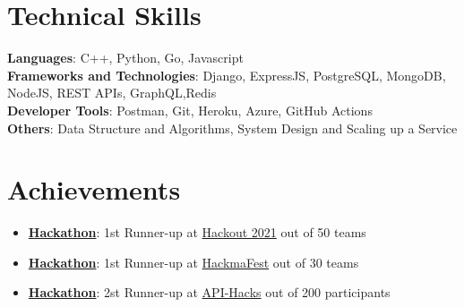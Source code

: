 \documentclass[letterpaper,11pt]{article}
\newcommand{\resumeItem}[1]{
  \item\small{
    {#1 \vspace{-2pt}}
  }
}
\newcommand{\resumeItemListStart}{\begin{itemize}}
\newcommand{\resumeItemListEnd}{\end{itemize}\vspace{-5pt}}
\begin{document}
%
\section{Technical Skills}
 \begin{itemize}[leftmargin=0.15in, label={}]
    \small{\item{
     \textbf{Languages}{: C++, Python, Go, Javascript} \\
     \textbf{Frameworks and Technologies}{: Django, ExpressJS, PostgreSQL, MongoDB, NodeJS, REST APIs, GraphQL,Redis} \\
     \textbf{Developer Tools}{: Postman, Git, Heroku, Azure, GitHub Actions} \\
     \textbf{Others}{: Data Structure and Algorithms, System Design and Scaling up a Service}\\
    }}
 \end{itemize}

\section{Achievements}
 \begin{itemize}[leftmargin=0.15in, label={}]
    \small{\item{
        \resumeItemListStart
                \resumeItem{\textbf{\href{Link if any}{Hackathon}}: 1st Runner-up at \href{https://www.hackout.io/}{Hackout 2021} out of 50 teams}
                \resumeItem{\textbf{\href{Link if any}{Hackathon}}: 1st Runner-up at \href{https://hackmafest.tech/}{HackmaFest} out of 30 teams}
                \resumeItem{\textbf{\href{Link if any}{Hackathon}}: 2st Runner-up at \href{https://apihacks.co/}{API-Hacks} out of 200 participants}
      \resumeItemListEnd
    }}
 \end{itemize}
\end{document}
